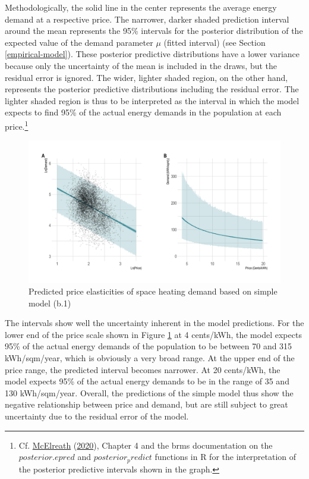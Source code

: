 \documentclass[12pt,twoside]{reedthesis}
\begin{document}
Methodologically, the solid line in the center represents the average energy demand at a respective price. The narrower, darker shaded prediction interval around the mean represents the 95\% intervals for the posterior distribution of the expected value of the demand parameter \(\mu\) (fitted interval) (see Section \ref{empirical-model}). These posterior predictive distributions have a lower variance because only the uncertainty of the mean is included in the draws, but the residual error is ignored. The wider, lighter shaded region, on the other hand, represents the posterior predictive distributions including the residual error. The lighter shaded region is thus to be interpreted as the interval in which the model expects to find 95\% of the actual energy demands in the population at each price.\footnote{Cf. \protect\hyperlink{ref-mcelreath20}{McElreath} (\protect\hyperlink{ref-mcelreath20}{2020}), Chapter 4 and the brms documentation on the \(posterior.epred\) and \(posterior_predict\) functions in R for the interpretation of the posterior predictive intervals shown in the graph.}
\begin{figure}

{\centering \includegraphics[width=1\linewidth]{figure/b1_prediction} 

}

\caption{Predicted price elasticities of space heating demand based on simple model (b.1)}\label{fig:elasticity-predictions-b1}
\end{figure}
The intervals show well the uncertainty inherent in the model predictions. For the lower end of the price scale shown in Figure \ref{fig:elasticity-predictions-b1} at 4 cents/kWh, the model expects 95\% of the actual energy demands of the population to be between 70 and 315 kWh/sqm/year, which is obviously a very broad range. At the upper end of the price range, the predicted interval becomes narrower. At 20 cents/kWh, the model expects 95\% of the actual energy demands to be in the range of 35 and 130 kWh/sqm/year. Overall, the predictions of the simple model thus show the negative relationship between price and demand, but are still subject to great uncertainty due to the residual error of the model.
\end{document}

